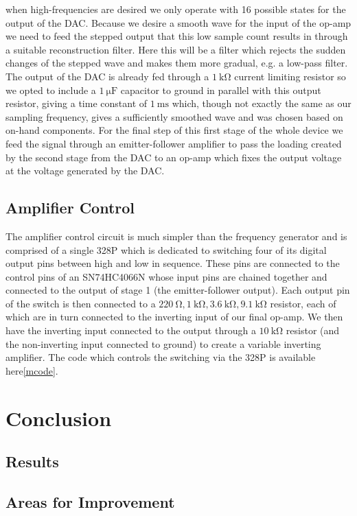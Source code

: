 \documentclass[10pt, twocolumn]{article}
\theoremstyle{definition}
\begin{document}
when high-frequencies are desired we only operate with 16 possible states for the output of the DAC. Because
we desire a smooth wave for the input of the op-amp we need to feed the stepped output that this
low sample count results in through a suitable reconstruction filter. Here this will be a filter which rejects
the sudden changes of the stepped wave and makes them more gradual, e.g. a low-pass filter. The output
of the DAC is already fed through a $\qty{1}{\kilo\ohm}$ current limiting resistor so we opted to include
a $\qty{1}{\micro\farad}$ capacitor to ground in parallel with this output resistor, giving a time constant of
$\qty{1}{\milli\second}$ which, though not exactly the same as our sampling frequency, gives a sufficiently smoothed wave
and was chosen based on on-hand components. For the final step of this first stage of the whole device we feed the signal
through an emitter-follower amplifier to pass the loading created by the second stage
from the DAC to an op-amp which fixes the output voltage at the voltage generated by the DAC.
\subsection{Amplifier Control}
The amplifier control circuit is much simpler than the frequency generator and is comprised
of a single 328P which is dedicated to switching four of its digital output pins between high and
low in sequence. These pins are connected to the control pins of an SN74HC4066N\cite{} whose input pins are chained 
together and connected to the output of stage 1 (the emitter-follower output). Each output pin of the switch
is then connected to a $\qty{220}{\ohm},\qty{1}{\kilo\ohm}, \qty{3.6}{\kilo\ohm}, \qty{9.1}{\kilo\ohm}$ resistor, each of which are
in turn connected to the inverting input of our final op-amp. We then have the inverting input connected to the output
through a $\qty{10}{\kilo\ohm}$ resistor (and the non-inverting input connected to ground) to create a variable
inverting amplifier. The code which controls the switching via the 328P is available here\ref{mcode}.
\section{Conclusion}

\subsection{Results}
\subsection{Areas for Improvement}
\end{document}
